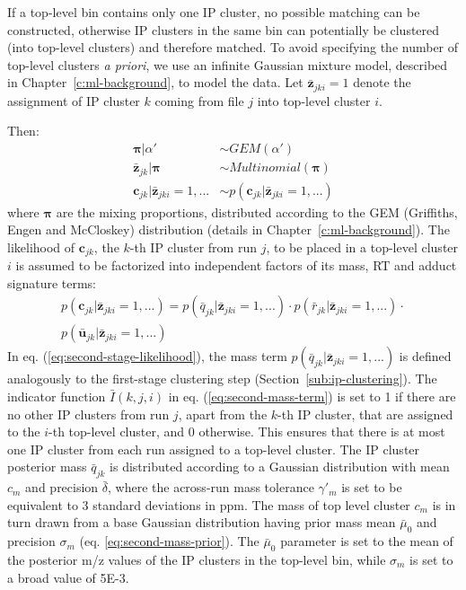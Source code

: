 If a top-level bin contains only one IP cluster, no possible matching can be constructed, otherwise IP clusters in the same bin can potentially be clustered (into top-level clusters) and therefore matched. To avoid specifying the number of top-level clusters \textit{a priori}, we use an infinite Gaussian mixture model, described in Chapter~\ref{c:ml-background}, to model the data. Let $\boldsymbol{\bar{z}}_{jki}=1$ denote the assignment of IP cluster $k$ coming from file $j$ into top-level cluster $i$.

Then:
\begin{align}
\boldsymbol{\pi}\vert\alpha' &\sim GEM(\alpha') \\
\boldsymbol{\bar{z}}_{jk}\vert\boldsymbol{\pi} &\sim Multinomial(\boldsymbol{\pi}) \\
\boldsymbol{c}_{jk}\vert\boldsymbol{\bar{z}}_{jki}=1,... &\sim p(\boldsymbol{c}_{jk}\vert\boldsymbol{\bar{z}}_{jki}=1,...)
\end{align}
where $\boldsymbol{\pi}$ are the mixing proportions, distributed according to the GEM (Griffiths, Engen and McCloskey) distribution (details in Chapter~\ref{c:ml-background}). The likelihood of $\boldsymbol{c}_{jk}$, the $k$-th IP cluster from run $j$, to be placed in a top-level cluster $i$ is assumed to be factorized into independent factors of its mass, RT and adduct signature terms:
\begin{equation}\label{eq:second-stage-likelihood}
\begin{split}
p(\boldsymbol{c}_{jk}\vert\boldsymbol{\bar{z}}_{jki}=1,...) = p({\bar{q}}_{jk}\vert\boldsymbol{\bar{z}}_{jki}=1,...) \cdot p({\bar{r}}_{jk}\vert\boldsymbol{\bar{z}}_{jki}=1,...) \cdot \\
p({\boldsymbol{\bar{u}}}_{jk}\vert\boldsymbol{\bar{z}}_{jki}=1,...)
\end{split}
\end{equation}
In eq. (\ref{eq:second-stage-likelihood}), the mass term $p({\bar{q}}_{jk}\vert\boldsymbol{\bar{z}}_{jki}=1,...)$ is defined analogously to the first-stage clustering step (Section~\ref{sub:ip-clustering}). The indicator function $\bar{I}(k,j,i)$ in eq. (\ref{eq:second-mass-term}) is set to 1 if there are no other IP clusters from run $j$, apart from the $k$-th IP cluster, that are assigned to the $i$-th top-level cluster, and 0 otherwise. This ensures that there is at most one IP cluster from each run assigned to a top-level cluster. The IP cluster posterior mass ${\bar{q}}_{jk}$ is distributed according to a Gaussian distribution with mean $c_m$ and precision $\bar{\delta}$, where the across-run mass tolerance $\gamma'_m$ is set to be equivalent to 3 standard deviations in ppm. The mass of top level cluster $c_m$ is in turn drawn from a base Gaussian distribution having prior mass mean $\bar{\mu}_0$ and precision $\sigma_m$ (eq. \ref{eq:second-mass-prior}). The $\bar{\mu}_0$ parameter is set to the mean of the posterior m/z values of the IP clusters in the top-level bin, while $\sigma_m$ is set to a broad value of 5E-3. 
